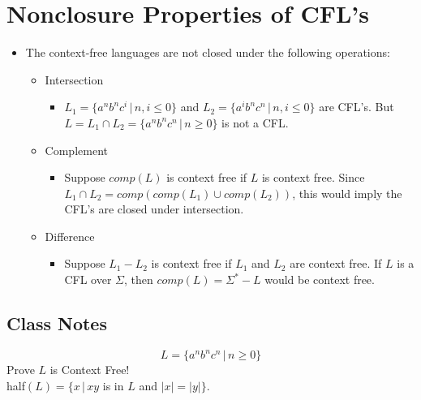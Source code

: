 \documentclass[]{article}
\begin{document}
\section{Nonclosure Properties of CFL's}
  \begin{itemize}
    \item The context-free languages are not closed under the following 
    operations:
      \begin{itemize}
        \item Intersection
          \begin{itemize}
            \item $L_1 = \{ a^nb^nc^i \, | \,n, i \leq 0 \}$ and 
            $L_2 = \{ a^ib^nc^n \, | \, n, i \leq 0 \}$ are CFL's. But
            $L = L_1 \cap L_2 = \{a^nb^nc^n \, | \, n \geq 0 \}$ is not a CFL.
          \end{itemize}
        \item Complement
          \begin{itemize}
            \item Suppose $comp(L)$ is context free if $L$ is context free. 
            Since $L_1 \cap L_2 = comp(comp(L_1) \cup comp(L_2))$, this would
            imply the CFL's are closed under intersection.
          \end{itemize}
        \item Difference
          \begin{itemize}
            \item Suppose $L_1 - L_2$ is context free if $L_1$ and $L_2$ are 
            context free. If $L$ is a CFL over $\Sigma$, then 
            $comp(L) = \Sigma^* - L$ would be context free.
          \end{itemize}
      \end{itemize}
  \end{itemize}
  \subsection*{Class Notes}
    \[ L = \{ a^nb^nc^n \, | \, n \geq 0 \} \] Prove $L$ is Context Free! \\
    half$(L) = \{ x \, | \, xy$ is in $L$ and $|x| = |y| \}$.
  
\end{document}
